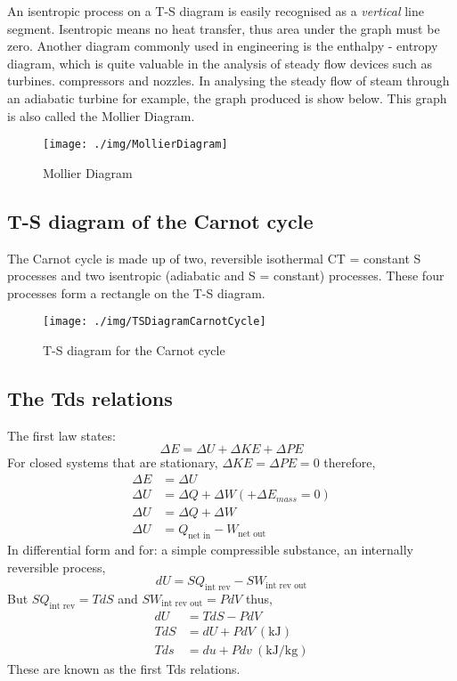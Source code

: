 An isentropic process on a T-S diagram is easily recognised as a \emph{vertical} line segment. Isentropic means no heat transfer, thus area under the graph must be zero. Another diagram commonly used in engineering is the enthalpy - entropy diagram, which is quite valuable in the analysis of steady flow devices such as turbines. compressors and nozzles. In analysing the steady flow of steam through an adiabatic turbine for example, the graph produced is show below. This graph is also called the Mollier Diagram.
\begin{figure}
  \texttt{[image: ./img/MollierDiagram]}
  \caption{Mollier Diagram}
\end{figure}
\subsection{T-S diagram of the Carnot cycle}
The Carnot cycle is made up of two, reversible isothermal CT = constant S processes and two isentropic (adiabatic and S = constant) processes. These four processes form a rectangle on the T-S diagram.
\begin{figure}
  \texttt{[image: ./img/TSDiagramCarnotCycle]}
  \caption{T-S diagram for the Carnot cycle}
\end{figure}
\subsection{The Tds relations}
The first law states:
\begin{equation}
  \Delta E = \Delta U + \Delta KE + \Delta PE
\end{equation}
For closed systems that are stationary, \( \Delta KE = \Delta PE = 0 \) therefore,
\begin{align}
  \Delta E & = \Delta U                                    \\
  \Delta U & = \Delta Q + \Delta W (+ \Delta E_{mass} = 0) \\
  \Delta U & = \Delta Q + \Delta W                         \\
  \Delta U & = Q_{\textrm{net in}} - W_{\textrm{net out}}
\end{align}
In differential form and for: a simple compressible substance, an internally reversible process,
\begin{equation}
  dU = SQ_{\textrm{int rev}} - SW_{\textrm{int rev out}}
\end{equation}
But \( SQ_{\textrm{int rev}} = T dS \) and \( SW_{\textrm{int rev out}} = PdV\) thus,
\begin{align}
  dU  & = TdS - PdV                            \\
  TdS & = dU + PdV \ (\si{\kilo\joule})        \\
  Tds & = du + Pdv \ (\si{\kilo\joule\per\kg})
\end{align}
These are known as the first Tds relations.

